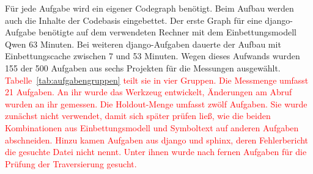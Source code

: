 Für jede Aufgabe wird ein eigener Codegraph benötigt. Beim Aufbau werden auch die Inhalte der Codebasis eingebettet. Der erste Graph für eine django-Aufgabe benötigte auf dem verwendeten Rechner mit dem Einbettungsmodell Qwen 63 Minuten. Bei weiteren django-Aufgaben dauerte der Aufbau mit Einbettungscache zwischen 7 und 53 Minuten. Wegen dieses Aufwands wurden 155 der 500 Aufgaben aus sechs Projekten für die Messungen ausgewählt. \textcolor{red}{Tabelle~\ref{tab:aufgabengruppen} teilt sie in vier Gruppen. Die Messmenge umfasst 21 Aufgaben. An ihr wurde das Werkzeug entwickelt, Änderungen am Abruf wurden an ihr gemessen. Die Holdout-Menge umfasst zwölf Aufgaben. Sie wurde zunächst nicht verwendet, damit sich später prüfen ließ, wie die beiden Kombinationen aus Einbettungsmodell und Symboltext auf anderen Aufgaben abschneiden. Hinzu kamen Aufgaben aus django und sphinx, deren Fehlerbericht die gesuchte Datei nicht nennt. Unter ihnen wurde nach fernen Aufgaben für die Prüfung der Traversierung gesucht.}
